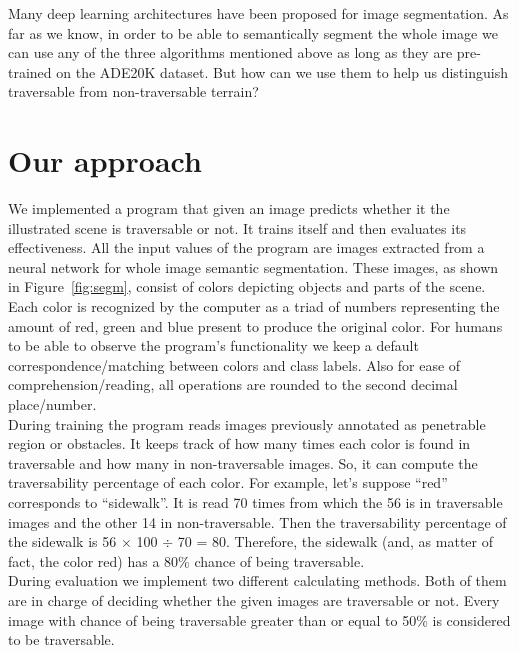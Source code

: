 \documentclass[12pt,a4paper,table,dvipsnames,tikz]{report}
\newcommand{\alleg}{\enquote}
\newcommand{\acronym}{\MakeUppercase}
\newcommand{\bl}[1]{{\hypersetup{linkcolor=blue}#1}}
\begin{document}
	
	Many deep learning architectures have been proposed for image segmentation. As far as
	we know, in order to be able to semantically segment the whole image we can use any 
	of the three algorithms mentioned above as long as they are pre-trained on the 
	\acronym{ade20k} dataset. But how can we use them to help us distinguish traversable 
	from non-traversable terrain?
	\\
		
	\section{Our approach}
	\label{sec:fg:app}
	
	We implemented a program that given an image predicts whether it the illustrated scene 
	is traversable or not. It trains itself and then evaluates its effectiveness. All 
	the input values of the program are images extracted from a neural network for whole 
	image semantic segmentation. These images, as shown in Figure~\bl{\ref{fig:segm}}, consist 
	of colors depicting objects and parts of the scene. Each color is recognized by the 
	computer as a triad of numbers representing the amount of red, green and blue present 
	to produce the original color. For humans to be able to observe the program's 
	functionality we keep a default correspondence/matching between colors and class labels. 
	Also for ease of comprehension/reading, all operations are rounded to the second decimal place/number.
	\\
	
	During training the program reads images previously annotated as penetrable region or 
	obstacles. It keeps track of how many times 
	each color is found in traversable and how many in non-traversable images. So, it can 
	compute the traversability percentage of each color. For example, let's suppose \alleg{red} corresponds to \alleg{sidewalk}. It is read 70 times from which the 
	56 is in traversable images and the other 14 in non-traversable. Then the traversability 
	percentage of the sidewalk is 56 $\times$ 100 $\div$ 70 = 80. Therefore, the sidewalk 
	(and, as matter of fact, the color red)	has a 80\% chance of being traversable.
	\\
	
	During evaluation we implement two different calculating methods. Both of them are in 
	charge of deciding whether the given images are traversable or not. Every image with 
	chance of being traversable greater than or equal to 50\% is considered to be traversable.
	
\end{document}
